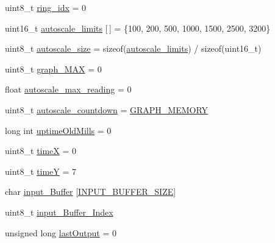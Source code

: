 \begin{DoxyCompactItemize}
\item 
uint8\+\_\+t \hyperlink{_u_s_b___tester___o_l_e_d__128x64___beta__2_82_8ino_a22eeba60dfa23b90b6e9f4fbac6316be}{ring\+\_\+idx} = 0
\item 
uint16\+\_\+t \hyperlink{_u_s_b___tester___o_l_e_d__128x64___beta__2_82_8ino_a5e6950a9f8d69b3df871ce20216fb3e0}{autoscale\+\_\+limits} \mbox{[}$\,$\mbox{]} = \{100, 200, 500, 1000, 1500, 2500, 3200\}
\item 
uint8\+\_\+t \hyperlink{_u_s_b___tester___o_l_e_d__128x64___beta__2_82_8ino_aa26b574e5f1fde87071043dbe2013d2a}{autoscale\+\_\+size} = sizeof(\hyperlink{_u_s_b___tester___o_l_e_d__128x64___beta__2_82_8ino_a5e6950a9f8d69b3df871ce20216fb3e0}{autoscale\+\_\+limits}) / sizeof(uint16\+\_\+t)
\item 
uint8\+\_\+t \hyperlink{_u_s_b___tester___o_l_e_d__128x64___beta__2_82_8ino_a13a5836f0f43bdaf5bbe108a24edd4e3}{graph\+\_\+\+M\+AX} = 0
\item 
float \hyperlink{_u_s_b___tester___o_l_e_d__128x64___beta__2_82_8ino_a70bec54816761f09c0d554f2d29cd110}{autoscale\+\_\+max\+\_\+reading} = 0
\item 
uint8\+\_\+t \hyperlink{_u_s_b___tester___o_l_e_d__128x64___beta__2_82_8ino_a7a77fb78a7d7064b3981f5a209051b47}{autoscale\+\_\+countdown} = \hyperlink{_u_s_b___tester___o_l_e_d__128x64___beta__2_82_8ino_a2c0a8e83033b6e3ab82b31600463e2f8}{G\+R\+A\+P\+H\+\_\+\+M\+E\+M\+O\+RY}
\item 
long int \hyperlink{_u_s_b___tester___o_l_e_d__128x64___beta__2_82_8ino_a193ac777dcbcdb1054041c1984293ad0}{uptime\+Old\+Mills} = 0
\item 
uint8\+\_\+t \hyperlink{_u_s_b___tester___o_l_e_d__128x64___beta__2_82_8ino_a9357112cd66fcbcbc9baca9ab892948a}{timeX} = 0
\item 
uint8\+\_\+t \hyperlink{_u_s_b___tester___o_l_e_d__128x64___beta__2_82_8ino_a088f1e4f7c286a1a66744c446abf4ac6}{timeY} = 7
\item 
char \hyperlink{_u_s_b___tester___o_l_e_d__128x64___beta__2_82_8ino_ae5ab12e6cdc6eab5697b18ba15229f4d}{input\+\_\+\+Buffer} \mbox{[}\hyperlink{_u_s_b___tester___o_l_e_d__128x64___beta__2_82_8ino_aa9b8dcc02cea15aab8e3d0b7860327a7}{I\+N\+P\+U\+T\+\_\+\+B\+U\+F\+F\+E\+R\+\_\+\+S\+I\+ZE}\mbox{]}
\item 
uint8\+\_\+t \hyperlink{_u_s_b___tester___o_l_e_d__128x64___beta__2_82_8ino_aafadc1fcbcb00fd21ebbe42be9e6b61e}{input\+\_\+\+Buffer\+\_\+\+Index}
\item 
unsigned long \hyperlink{_u_s_b___tester___o_l_e_d__128x64___beta__2_82_8ino_aea1a858a9b039ab2880a2b7dfa3fccd6}{last\+Output} = 0

\end{DoxyCompactItemize}
